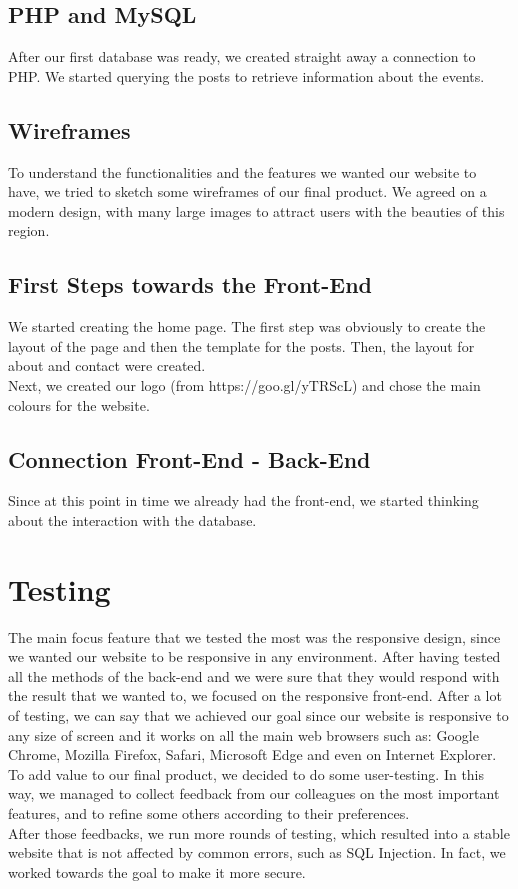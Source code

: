 \documentclass[a4paper]{article}
\begin{document}
	\subsection{PHP and MySQL}
	After our first database was ready, we created straight away a connection to PHP. We started querying the posts to retrieve information about the events.
	
	\subsection{Wireframes}
	To understand the functionalities and the features we wanted our website to have, we tried to sketch some wireframes of our final product. We agreed on a modern design, with many large images to attract users with the beauties of this region. 
	
	\subsection{First Steps towards the Front-End}
	We started creating the home page. The first step was obviously to create the layout of the page and then the template for the posts. Then, the layout for about and contact were created.\\
	Next, we created our logo (from https://goo.gl/yTRScL) and chose the main colours for the website.
	
	\subsection{Connection Front-End - Back-End}
	Since at this point in time we already had the front-end, we started thinking about the interaction with the database. 
	
	\section{Testing}
	The main focus feature that we tested the most was the responsive design, since we wanted our website to be responsive in any environment. After having tested all the methods of the back-end and we were sure that they would respond with the result that we wanted to, we focused on the responsive front-end. After a lot of testing, we can say that we achieved our goal since our website is responsive to any size of screen and it works on all the main web browsers such as: Google Chrome, Mozilla Firefox, Safari, Microsoft Edge and even on Internet Explorer.\\
	To add value to our final product, we decided to do some user-testing. In this way, we managed to collect feedback from our colleagues on the most important features, and to refine some others according to their preferences.\\
	After those feedbacks, we run more rounds of testing, which resulted into a stable website that is not affected by common errors, such as SQL Injection. In fact, we worked towards the goal to make it more secure.\\
	
\end{document}
